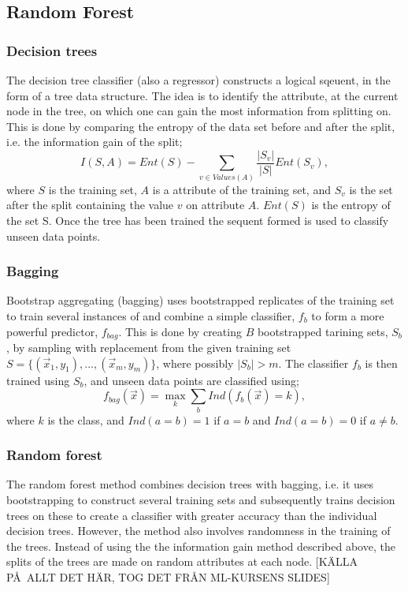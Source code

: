 \documentclass{article}
\begin{document}
\subsection{Random Forest}
\subsubsection{Decision trees}
The decision tree classifier (also a regressor) constructs a logical sqeuent, in the form of a tree data structure. The idea is to identify the attribute, at the current node in the tree, on which one can gain the most information from splitting on. This is done by comparing the entropy of the data set before and after the split, i.e. the information gain of the split;
\begin{equation}
I(S, A) = Ent(S) - \sum\limits_{v \in Values(A)} \frac{|S_v|}{|S|} Ent(S_v),
\end{equation}
where $S$ is the training set, $A$ is a attribute of the training set, and $S_v$ is the set after the split containing the value $v$ on attribute $A$. $Ent(S)$ is the entropy of the set S. Once the tree has been trained the sequent formed is used to classify unseen data points.
\subsubsection{Bagging}
Bootstrap aggregating (bagging) uses bootstrapped replicates of the training set to train several instances of and combine a simple classifier, $f_b$ to form a more powerful predictor, $f_{bag}$. This is done by creating $B$ bootstrapped tarining sets, $S_b$, by sampling with replacement from the given training set $S = \{ (\vec{x}_1, y_1), ..., (\vec{x}_m, y_m)\}$, where possibly $|S_b| > m$. The classifier $f_b$ is then trained using $S_b$, and unseen data points are classified using; 
\begin{equation}
f_{bag}(\vec{x}) = \max\limits_k \sum\limits_b Ind(f_b(\vec{x}) = k),
\end{equation}
where $k$ is the class, and $Ind(a = b) = 1$ if $a = b$ and $Ind(a = b) = 0$ if $a \ne b$.

\subsubsection{Random forest}
The random forest method combines decision trees with bagging, i.e. it uses bootstrapping to construct several training sets and subsequently trains decision trees on these to create a classifier with greater accuracy than the individual decision trees. However, the method also involves randomness in the training of the trees. Instead of using the the information gain method described above, the splits of the trees are made on random attributes at each node.  [K\"ALLA P\AA\ ALLT DET H\"AR, TOG DET FR\AA N ML-KURSENS SLIDES]
\end{document}
